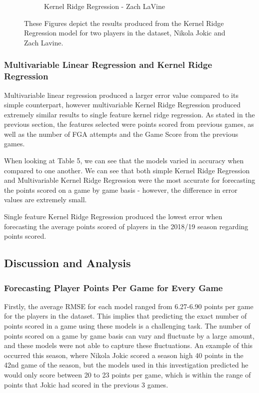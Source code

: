 \documentclass[a4paper,11pt,twoside]{article}
\begin{document}
\begin{figure} [h!]
\begin{subfigure}[b]{0.75\textwidth}
    \caption{Kernel Ridge Regression - Zach LaVine}
    \label{fig:2}
  \end{subfigure}
\caption{These Figures depict the results produced from the Kernel Ridge Regression model for two players in the dataset, Nikola Jokic and Zach Lavine.}
\end{figure}

\subsubsection{Multivariable Linear Regression and Kernel Ridge Regression}
Multivariable  linear regression produced a larger error value compared to its simple counterpart, however multivariable Kernel Ridge Regression produced extremely similar results to single feature kernel ridge regression. As stated in the previous section, the features selected were points scored from previous games, as well as the number of FGA attempts and the Game Score from the previous games.
\vspace{5mm}

When looking at Table 5, we can see that the models varied in accuracy when compared to one another. We can see that both simple Kernel Ridge Regression and Multivariable Kernel Ridge Regression were the most accurate for forecasting the points scored on a game by game basis - however, the difference in error values are extremely small.

Single feature Kernel Ridge Regression produced the lowest error when forecasting the average points scored of players in the 2018/19 season regarding points scored.


\subsection{Discussion and Analysis}
\vspace{6mm}

\subsubsection{Forecasting Player Points Per Game for Every Game}
Firstly, the average RMSE for each model ranged from 6.27-6.90 points per game for the players in the dataset. This implies that predicting the exact number of points scored in a game using these models is a challenging task. The number of points scored on a game by game basis can vary and fluctuate by a large amount, and these models were not able to capture these fluctuations. An example of this occurred this season, where Nikola Jokic scored a season high 40 points in the 42nd game of the season, but the models used in this investigation predicted he would only score between 20 to 23 points per game, which is within the range of points that Jokic had scored in the previous 3 games. 
\end{document}
